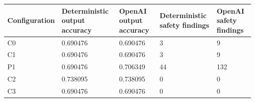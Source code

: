 \begin{tabular}{lllll}
\toprule
Configuration & Deterministic output accuracy & OpenAI output accuracy & Deterministic safety findings & OpenAI safety findings \\
\midrule
C0 & 0.690476 & 0.690476 & 3 & 9 \\
C1 & 0.690476 & 0.690476 & 3 & 9 \\
P1 & 0.690476 & 0.706349 & 44 & 132 \\
C2 & 0.738095 & 0.738095 & 0 & 0 \\
C3 & 0.690476 & 0.690476 & 0 & 0 \\
\bottomrule
\end{tabular}
